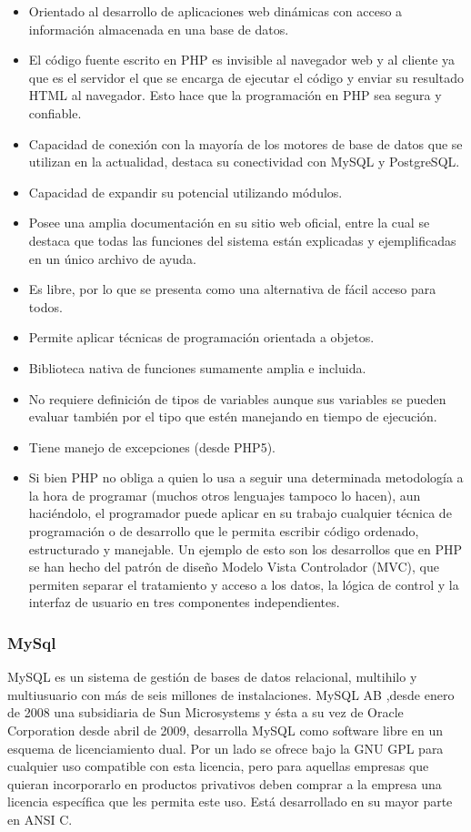 \begin{itemize}
\item Orientado al desarrollo de aplicaciones web dinámicas con acceso a información almacenada en una base de datos.
\item El código fuente escrito en PHP es invisible al navegador web y al cliente ya que es el servidor el que se encarga de ejecutar el código y enviar su resultado HTML al navegador. Esto hace que la programación en PHP sea segura y confiable.
\item Capacidad de conexión con la mayoría de los motores de base de datos que se utilizan en la actualidad, destaca su conectividad con MySQL y PostgreSQL.
\item Capacidad de expandir su potencial utilizando módulos.
\item Posee una amplia documentación en su sitio web oficial, entre la cual se destaca que todas las funciones del sistema están explicadas y ejemplificadas en un único archivo de ayuda.
\item Es libre, por lo que se presenta como una alternativa de fácil acceso para todos.
\item Permite aplicar técnicas de programación orientada a objetos.
\item Biblioteca nativa de funciones sumamente amplia e incluida.
\item No requiere definición de tipos de variables aunque sus variables se pueden evaluar también por el tipo que estén manejando en tiempo de ejecución.
\item Tiene manejo de excepciones (desde PHP5).
\item Si bien PHP no obliga a quien lo usa a seguir una determinada metodología a la hora de programar (muchos otros lenguajes tampoco lo hacen), aun haciéndolo, el programador puede aplicar en su trabajo cualquier técnica de programación o de desarrollo que le permita escribir código ordenado, estructurado y manejable. Un ejemplo de esto son los desarrollos que en PHP se han hecho del patrón de diseño Modelo Vista Controlador (MVC), que permiten separar el tratamiento y acceso a los datos, la lógica de control y la interfaz de usuario en tres componentes independientes.
\end{itemize}

\subsubsection{MySql}
MySQL es un sistema de gestión de bases de datos relacional, multihilo y multiusuario con más de seis millones de instalaciones. MySQL AB ,desde enero de 2008 una subsidiaria de Sun Microsystems y ésta a su vez de Oracle Corporation desde abril de 2009, desarrolla MySQL como software libre en un esquema de licenciamiento dual.
Por un lado se ofrece bajo la GNU GPL para cualquier uso compatible con esta licencia, pero para aquellas empresas que quieran incorporarlo en productos privativos deben comprar a la empresa una licencia específica que les permita este uso. Está desarrollado en su mayor parte en ANSI C.\\

